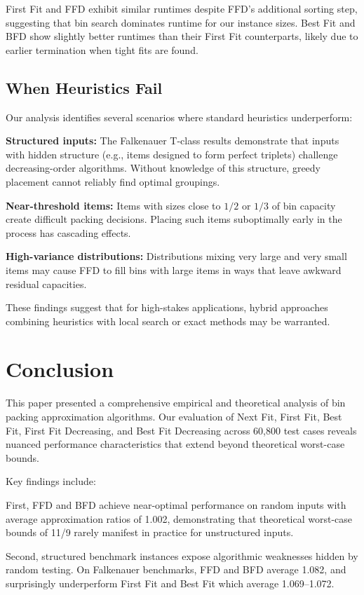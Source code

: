 \documentclass[11pt,a4paper]{article}
\begin{document}
First Fit and FFD exhibit similar runtimes despite FFD's additional sorting step, suggesting that bin search dominates runtime for our instance sizes. Best Fit and BFD show slightly better runtimes than their First Fit counterparts, likely due to earlier termination when tight fits are found.

\subsection{When Heuristics Fail}

Our analysis identifies several scenarios where standard heuristics underperform:

\textbf{Structured inputs:} The Falkenauer T-class results demonstrate that inputs with hidden structure (e.g., items designed to form perfect triplets) challenge decreasing-order algorithms. Without knowledge of this structure, greedy placement cannot reliably find optimal groupings.

\textbf{Near-threshold items:} Items with sizes close to $1/2$ or $1/3$ of bin capacity create difficult packing decisions. Placing such items suboptimally early in the process has cascading effects.

\textbf{High-variance distributions:} Distributions mixing very large and very small items may cause FFD to fill bins with large items in ways that leave awkward residual capacities.

These findings suggest that for high-stakes applications, hybrid approaches combining heuristics with local search or exact methods may be warranted.

\section{Conclusion}

This paper presented a comprehensive empirical and theoretical analysis of bin packing approximation algorithms. Our evaluation of Next Fit, First Fit, Best Fit, First Fit Decreasing, and Best Fit Decreasing across 60,800 test cases reveals nuanced performance characteristics that extend beyond theoretical worst-case bounds.

Key findings include:

First, FFD and BFD achieve near-optimal performance on random inputs with average approximation ratios of 1.002, demonstrating that theoretical worst-case bounds of 11/9 rarely manifest in practice for unstructured inputs.

Second, structured benchmark instances expose algorithmic weaknesses hidden by random testing. On Falkenauer benchmarks, FFD and BFD average 1.082, and surprisingly underperform First Fit and Best Fit which average 1.069--1.072.
\end{document}
